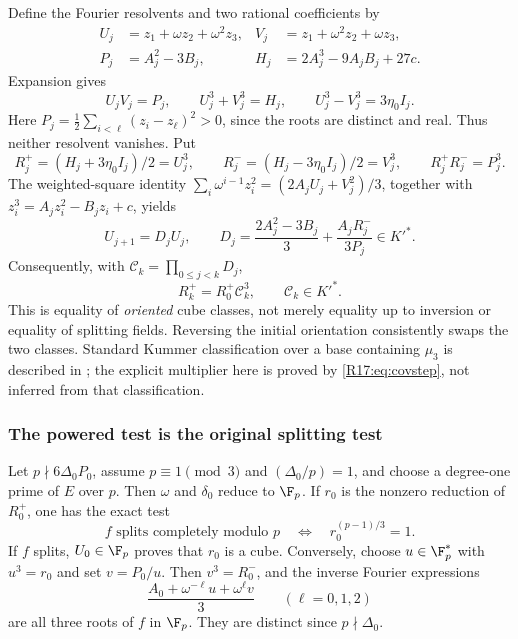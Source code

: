 \documentclass[11pt,a4paper]{article}
\theoremstyle{definition}\newtheorem{definition}[theorem]{Definition}
\theoremstyle{remark}\newtheorem{remark}[theorem]{Remark}
\begin{document}
Define the Fourier resolvents and two rational coefficients by
\[
 \begin{aligned}
 U_j&=z_1+\omega z_2+\omega^2z_3,&
 V_j&=z_1+\omega^2z_2+\omega z_3,\\
 P_j&=A_j^2-3B_j,&
 H_j&=2A_j^3-9A_jB_j+27c.
 \end{aligned}
\]
Expansion gives
\[
 U_jV_j=P_j,\qquad U_j^3+V_j^3=H_j,
 \qquad U_j^3-V_j^3=3\eta_0I_j.
\]
Here $P_j=\frac12\sum_{i<\ell}(z_i-z_\ell)^2>0$, since the roots
are distinct and real. Thus neither resolvent vanishes. Put
\[
 R_j^+=(H_j+3\eta_0I_j)/2=U_j^3,
 \qquad R_j^-=(H_j-3\eta_0I_j)/2=V_j^3,
 \qquad R_j^+R_j^-=P_j^3.
\]
The weighted-square identity
$\sum_i\omega^{i-1}z_i^2=(2A_jU_j+V_j^2)/3$, together with
$z_i^3=A_jz_i^2-B_jz_i+c$, yields
\begin{equation}\label{R17:eq:covstep}
 U_{j+1}=D_jU_j,\qquad
 D_j=\frac{2A_j^2-3B_j}{3}
       +\frac{A_jR_j^-}{3P_j}\in K'^*.
\end{equation}
Consequently, with $\mathcal C_k=\prod_{0\le j<k}D_j$,
\begin{equation}\label{R17:eq:covariance}
 R_k^+=R_0^+\mathcal C_k^3,\qquad\mathcal C_k\in K'^*.
\end{equation}
This is equality of \emph{oriented} cube classes, not merely equality
up to inversion or equality of splitting fields. Reversing the initial
orientation consistently swaps the two classes. Standard Kummer
classification over a base containing $\mu_3$ is described in
\cite[Propositions 5.27--5.28]{R17-Milne}; the explicit multiplier here is
proved by \eqref{R17:eq:covstep}, not inferred from that classification.

\subsubsection{The powered test is the original splitting test}

Let $p\nmid6\Delta_0P_0$, assume $p\equiv1\pmod3$ and
$(\Delta_0/p)=1$, and choose a degree-one prime of $E$ over $p$.
Then $\omega$ and $\delta_0$ reduce to $\F_p$. If $r_0$ is the
nonzero reduction of $R_0^+$, one has the exact test
\begin{equation}\label{R17:eq:split-test}
 f\text{ splits completely modulo }p
 \quad\Longleftrightarrow\quad r_0^{(p-1)/3}=1.
\end{equation}
If $f$ splits, $U_0\in\F_p$ proves that $r_0$ is a cube.
Conversely, choose $u\in\F_p^*$ with $u^3=r_0$ and set $v=P_0/u$.
Then $v^3=R_0^-$, and the inverse Fourier expressions
\[
 \frac{A_0+\omega^{-\ell}u+\omega^\ell v}{3}
 \qquad(\ell=0,1,2)
\]
are all three roots of $f$ in $\F_p$. They are distinct since
$p\nmid\Delta_0$.
\end{document}
